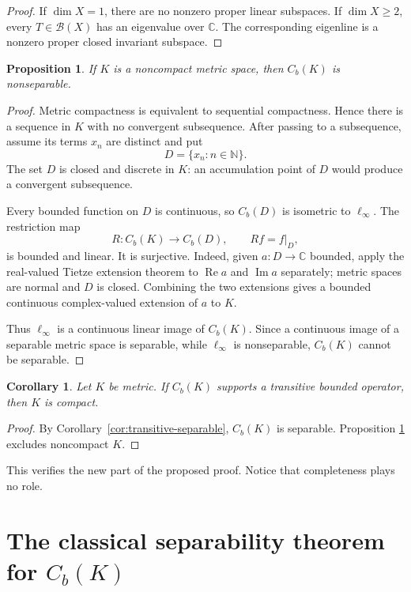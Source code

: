 \documentclass[11pt]{article}
\newtheorem{proposition}[theorem]{Proposition}
\newtheorem{corollary}[theorem]{Corollary}
\theoremstyle{remark}
\newcommand{\Cb}{C_b}
\newcommand{\B}{\mathcal B}
\newcommand{\N}{\mathbb N}
\newcommand{\C}{\mathbb C}
\newcommand{\ellinf}{\ell_\infty}
\begin{document}
\begin{proof}
If $\dim X=1$, there are no nonzero proper linear subspaces.  If
$\dim X\geq2$, every $T\in\B(X)$ has an eigenvalue over $\C$.  The
corresponding eigenline is a nonzero proper closed invariant subspace.
\end{proof}

\begin{proposition}\label{prop:metric-noncompact}
If $K$ is a noncompact metric space, then $\Cb(K)$ is nonseparable.
\end{proposition}

\begin{proof}
Metric compactness is equivalent to sequential compactness.  Hence there is a
sequence in $K$ with no convergent subsequence.  After passing to a
subsequence, assume its terms $x_n$ are distinct and put
\[
  D=\{x_n:n\in\N\}.
\]
The set $D$ is closed and discrete in $K$: an accumulation point of $D$ would
produce a convergent subsequence.

Every bounded function on $D$ is continuous, so $\Cb(D)$ is isometric to
$\ellinf$.  The restriction map
\[
  R:\Cb(K)\longrightarrow \Cb(D),\qquad Rf=f|_D,
\]
is bounded and linear.  It is surjective.  Indeed, given
$a:D\to\C$ bounded, apply the real-valued Tietze extension theorem to
$\operatorname{Re}a$ and $\operatorname{Im}a$ separately; metric spaces are
normal and $D$ is closed.  Combining the two extensions gives a bounded
continuous complex-valued extension of $a$ to $K$.

Thus $\ellinf$ is a continuous linear image of $\Cb(K)$.  Since a continuous
image of a separable metric space is separable, while $\ellinf$ is
nonseparable, $\Cb(K)$ cannot be separable.
\end{proof}

\begin{corollary}\label{cor:metric-necessity}
Let $K$ be metric.  If $\Cb(K)$ supports a transitive bounded operator, then
$K$ is compact.
\end{corollary}

\begin{proof}
By Corollary~\ref{cor:transitive-separable}, $\Cb(K)$ is separable.  Proposition
\ref{prop:metric-noncompact} excludes noncompact $K$.
\end{proof}

This verifies the new part of the proposed proof.  Notice that completeness
plays no role.

\section{The classical separability theorem for $C_b(K)$}
\end{document}

